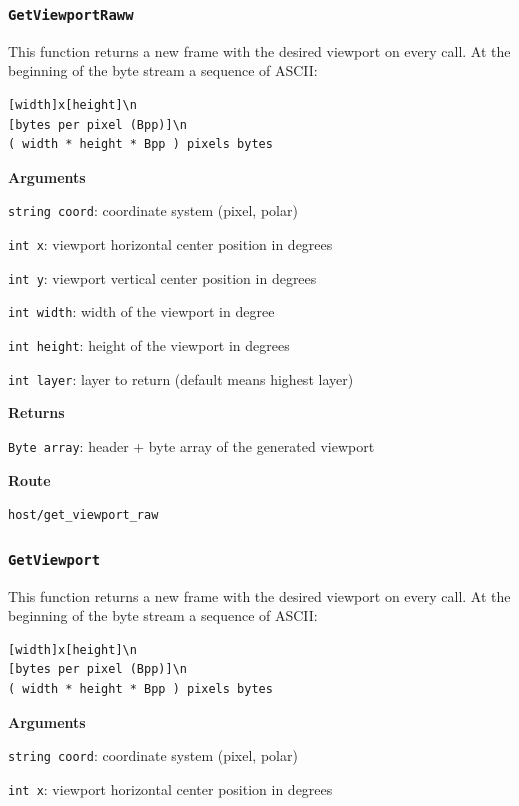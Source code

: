 \documentclass{article}
\begin{document}
\subsubsection*{\texttt{GetViewportRaww}}

This function returns a new frame with the desired viewport on every call.
At the beginning of the byte stream a sequence of ASCII:
\begin{verbatim}
[width]x[height]\n
[bytes per pixel (Bpp)]\n
( width * height * Bpp ) pixels bytes
\end{verbatim}

\textbf{Arguments}

\texttt{string coord}: coordinate system (pixel, polar)

\texttt{int x}: viewport horizontal center position in degrees

\texttt{int y}: viewport vertical center position in degrees

\texttt{int width}: width of the viewport in degree

\texttt{int height}: height of the viewport in degrees

\texttt{int layer}: layer to return (default means highest layer)

\textbf{Returns}

\texttt{Byte array}: header + byte array of the generated viewport

\textbf{Route}

\texttt{host/get_viewport_raw}


\subsubsection*{\texttt{GetViewport}}

This function returns a new frame with the desired viewport on every call.
At the beginning of the byte stream a sequence of ASCII:
\begin{verbatim}
[width]x[height]\n
[bytes per pixel (Bpp)]\n
( width * height * Bpp ) pixels bytes
\end{verbatim}

\textbf{Arguments}

\texttt{string coord}: coordinate system (pixel, polar)

\texttt{int x}: viewport horizontal center position in degrees
\end{document}
